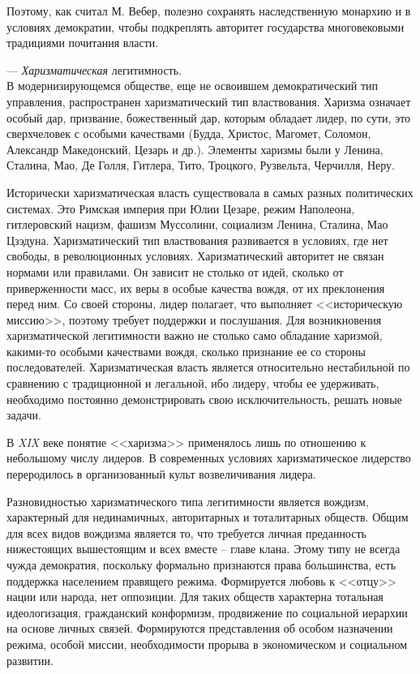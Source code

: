 Поэтому, как считал М. Вебер, полезно сохранять наследственную монархию и в
условиях демократии, чтобы подкреплять авторитет государства многовековыми
традициями почитания власти.

\vspace*{1em}
--- \emph{Харизматическая} легитимность.\\    
В модернизирующемся обществе, еще не освоившем демократический тип управления,
распространен харизматический тип властвования. Харизма означает особый дар,
призвание, божественный дар, которым обладает лидер, по сути, это сверхчеловек
с особыми качествами (Будда, Христос, Магомет, Соломон, Александр Македонский,
Цезарь и др.). Элементы харизмы были у Ленина, Сталина, Мао, Де Голля, Гитлера,
Тито, Троцкого, Рузвельта, Черчилля, Неру.

Исторически харизматическая власть существовала в самых разных политических
системах. Это Римская империя при Юлии Цезаре, режим Наполеона, гитлеровский
нацизм, фашизм Муссолини, социализм Ленина, Сталина, Мао Цзэдуна.
Харизматический тип властвования развивается в условиях, где нет свободы, в
революционных условиях. Харизматический авторитет не связан нормами или
правилами. Он зависит не столько от идей, сколько от приверженности масс, их
веры в особые качества вождя, от их преклонения перед ним. Со своей стороны,
лидер полагает, что выполняет <<историческую миссию>>, поэтому требует
поддержки и послушания. Для возникновения харизматической легитимности важно не
столько само обладание харизмой, какими-то особыми качествами вождя, сколько
признание ее со стороны последователей. Харизматическая власть является
относительно нестабильной по сравнению с традиционной и легальной, ибо лидеру,
чтобы ее удерживать, необходимо постоянно демонстрировать свою
исключительность, решать новые задачи.

В \emph{XIX} веке понятие <<харизма>> применялось лишь по отношению к
небольшому числу лидеров. В современных условиях харизматическое лидерство
переродилось в организованный культ возвеличивания лидера.

Разновидностью харизматического типа легитимности является вождизм, характерный
для нединамичных, авторитарных и тоталитарных обществ. Общим для всех видов
вождизма является то, что требуется личная преданность нижестоящих вышестоящим
и всех вместе -- главе клана. Этому типу не всегда чужда демократия, поскольку
формально признаются права большинства, есть поддержка населением правящего
режима. Формируется любовь к <<отцу>> нации или народа, нет оппозиции. Для
таких обществ характерна тотальная идеологизация, гражданский конформизм,
продвижение по социальной иерархии на основе личных связей. Формируются
представления об особом назначении режима, особой миссии, необходимости
прорыва в экономическом и социальном развитии.

